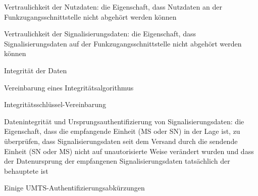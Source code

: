 \documentclass[a4paper]{article}
\begin{document}
\begin{multicols}{3}
\begin{itemize*}
\begin{itemize*}
                  \item Vertraulichkeit der Nutzdaten: die Eigenschaft, dass Nutzdaten an der Funkzugangsschnittstelle nicht abgehört werden können
                  \item Vertraulichkeit der Signalisierungsdaten: die Eigenschaft, dass Signalisierungsdaten auf der Funkzugangsschnittstelle nicht abgehört werden können
            \end{itemize*}
            \item Integrität der Daten
            \begin{itemize*}
                  \item Vereinbarung eines Integritätsalgorithmus
                  \item Integritätsschlüssel-Vereinbarung
                  \item Datenintegrität und Ursprungsauthentifizierung von Signalisierungsdaten: die Eigenschaft, dass die empfangende Einheit (MS oder SN) in der Lage ist, zu überprüfen, dass Signalisierungsdaten seit dem Versand durch die sendende Einheit (SN oder MS) nicht auf unautorisierte Weise verändert wurden und dass der Datenursprung der empfangenen Signalisierungsdaten tatsächlich der behauptete ist
            \end{itemize*}
      \end{itemize*}

      Einige UMTS-Authentifizierungsabkürzungen



\end{multicols}
\end{document}

